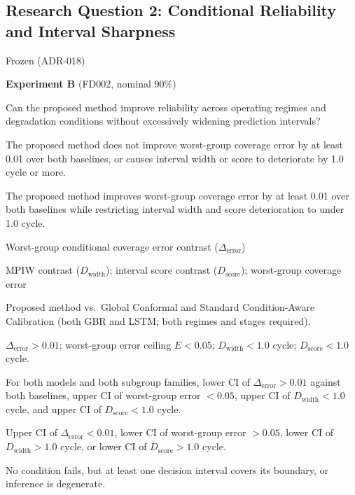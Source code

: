 \documentclass{article}
\begin{document}
\subsection*{Research Question 2: Conditional Reliability and Interval Sharpness}
\begin{description}[style=multiline,leftmargin=3.5cm]
  \item[Status:] Frozen (ADR-018)
  \item[Experiment:] \textbf{Experiment B} (FD002, nominal 90\%)
  \item[Question:] Can the proposed method improve reliability across operating regimes and degradation conditions without excessively widening prediction intervals?
  \item[Null ($H_{0,2}$):] The proposed method does not improve worst-group coverage error by at least 0.01 over both baselines, or causes interval width or score to deteriorate by 1.0 cycle or more.
  \item[Alt ($H_{1,2}$):] The proposed method improves worst-group coverage error by at least 0.01 over both baselines while restricting interval width and score deterioration to under 1.0 cycle.
  \item[Primary Outcome:] Worst-group conditional coverage error contrast ($\Delta_{\text{error}}$)
  \item[Supporting Outcomes:] MPIW contrast ($D_{\text{width}}$); interval score contrast ($D_{\text{score}}$); worst-group coverage error
  \item[Comparison:] Proposed method vs.\ Global Conformal and Standard Condition-Aware Calibration (both GBR and LSTM; both regimes and stages required).
  \item[Threshold:] $\Delta_{\text{error}} > 0.01$; worst-group error ceiling $E < 0.05$; $D_{\text{width}} < 1.0$ cycle; $D_{\text{score}} < 1.0$ cycle.
  \item[Supported Logic:] For both models and both subgroup families, lower CI of $\Delta_{\text{error}} > 0.01$ against both baselines, upper CI of worst-group error $< 0.05$, upper CI of $D_{\text{width}} < 1.0$ cycle, and upper CI of $D_{\text{score}} < 1.0$ cycle.
  \item[Unsupported Logic:] Upper CI of $\Delta_{\text{error}} < 0.01$, lower CI of worst-group error $> 0.05$, lower CI of $D_{\text{width}} > 1.0$ cycle, or lower CI of $D_{\text{score}} > 1.0$ cycle.
  \item[Inconclusive Logic:] No condition fails, but at least one decision interval covers its boundary, or inference is degenerate.
\end{description}
\end{document}

